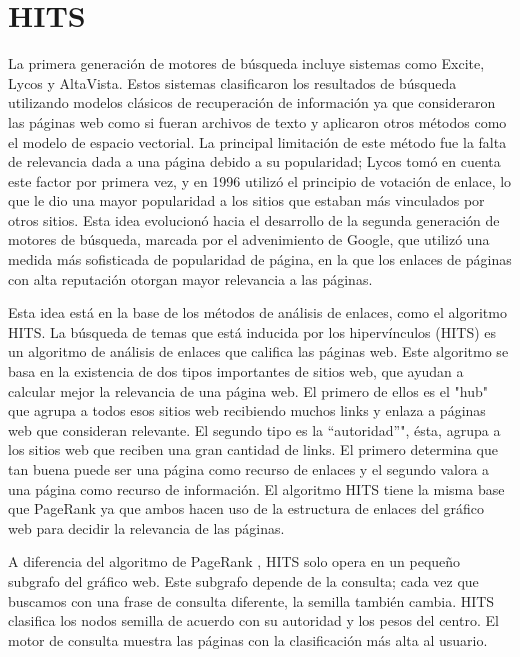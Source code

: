 \documentclass[11pt]{article}
\begin{document}
\section{HITS}
La primera generación de motores de búsqueda incluye sistemas como Excite, Lycos y AltaVista. Estos sistemas clasificaron los resultados de búsqueda utilizando modelos clásicos de recuperación de información ya que consideraron las páginas web como si fueran archivos de texto y aplicaron otros métodos como el modelo de espacio vectorial. La principal limitación de este método fue la falta de relevancia dada a una página debido a su popularidad;  Lycos tomó en cuenta este factor por primera vez, y en 1996 utilizó el principio de votación de enlace, lo que le dio una mayor popularidad a los sitios que estaban más vinculados por otros sitios.  Esta idea evolucionó hacia el desarrollo de la segunda generación de motores de búsqueda, marcada por el advenimiento de Google, que utilizó una medida más sofisticada de popularidad de página, en la que los enlaces de páginas con alta reputación otorgan mayor relevancia a las páginas. \par \vspace{0.3cm}
Esta idea está en la base de los métodos de análisis de enlaces, como el algoritmo HITS. La búsqueda de temas que está inducida por los hipervínculos (HITS) es un algoritmo de análisis de enlaces que califica las páginas web. Este algoritmo se basa en la existencia de dos tipos importantes de sitios web, que ayudan a calcular mejor la relevancia de una página web. El primero de ellos es el "hub" que agrupa a todos esos sitios web recibiendo muchos links y enlaza a páginas web que consideran relevante. El segundo tipo es la “autoridad”", ésta, agrupa a los sitios web que reciben una gran cantidad de links. El primero determina que tan buena puede ser una página como recurso de enlaces y el segundo valora a una página como recurso de información.
El algoritmo HITS tiene la misma base que PageRank ya que ambos hacen uso de la estructura de enlaces del gráfico web para decidir la relevancia de las páginas. \par \vspace{0.3cm}
A diferencia del algoritmo de PageRank , HITS solo opera en un pequeño subgrafo del gráfico web. Este subgrafo depende de la consulta; cada vez que buscamos con una frase de consulta diferente, la semilla también cambia. HITS clasifica los nodos semilla de acuerdo con su autoridad y los pesos del centro. El motor de consulta muestra las páginas con la clasificación más alta al usuario.
\end{document}
